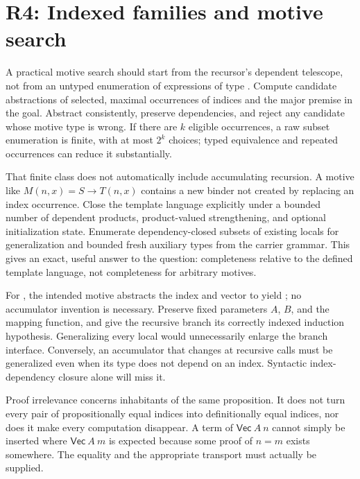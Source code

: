 \section{R4: Indexed families and motive search}\label{sec:r4}


A practical motive search should start from the recursor's dependent telescope,
not from an untyped enumeration of expressions of type . Compute
candidate abstractions of selected, maximal occurrences of indices and the
major premise in the goal. Abstract consistently, preserve dependencies, and
reject any candidate whose motive type is wrong. If there are $k$ eligible
occurrences, a raw subset enumeration is finite, with at most $2^k$ choices;
typed equivalence and repeated occurrences can reduce it substantially.

That finite class does not automatically include accumulating recursion. A
motive like $M(n,x)=S\to T(n,x)$ contains a new binder not created by replacing
an index occurrence. Close the template language explicitly under a bounded
number of dependent products, product-valued strengthening, and optional
initialization state. Enumerate dependency-closed subsets of existing locals
for generalization and bounded fresh auxiliary types from the carrier grammar.
This gives an exact, useful answer to the question: completeness relative to
the defined template language, not completeness for arbitrary motives.

For , the intended motive abstracts the index and
vector to yield ; no accumulator invention is necessary. Preserve
fixed parameters $A$, $B$, and the mapping function, and give the recursive
branch its correctly indexed induction hypothesis. Generalizing every local
would unnecessarily enlarge the branch interface. Conversely, an accumulator
that changes at recursive calls must be generalized even when its type does
not depend on an index. Syntactic index-dependency closure alone will miss it.


Proof irrelevance concerns inhabitants of the same proposition. It does not
turn every pair of propositionally equal indices into definitionally equal
indices, nor does it make every  computation disappear. A term of
$\mathsf{Vec}\ A\ n$ cannot simply be inserted where
$\mathsf{Vec}\ A\ m$ is expected because some proof of $n=m$ exists somewhere.
The equality and the appropriate transport must actually be supplied.

